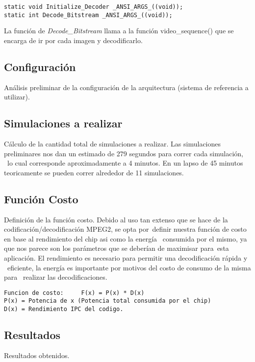 \documentclass[journal]{IEEEtran}
\begin{document}
\footnotesize \begin{verbatim}
static void Initialize_Decoder _ANSI_ARGS_((void));
static int Decode_Bitstream _ANSI_ARGS_((void));
\end{verbatim}
\normalsize

La funci\'{o}n de \textit{Decode\_Bitstream} llama a la funci\'{o}n video\_sequence() que se encarga de ir por cada imagen y decodificarlo. \newline

\subsection{Configuraci\'{o}n}
An\'{a}lisis preliminar de la configuraci\'{o}n de la arquitectura (sistema de referencia a utilizar).

\subsection{Simulaciones a realizar}
C\'{a}lculo de la cantidad total de simulaciones a realizar.
Las simulaciones preliminares nos dan un estimado de 279 segundos para correr cada simulaci\'{o}n, \
lo cual corresponde aproximadamente a 4 minutos.  En un lapso de 45 minutos teoricamente se pueden correr alrededor de 11 simulaciones.


\subsection{Funci\'{o}n Costo}
Definici\'{o}n de la funci\'{o}n costo.
Debido al uso tan extenso que se hace de la codificaci\'{o}n/decodificaci\'{o}n MPEG2, se opta por\
definir nuestra funci\'{o}n de costo en base al rendimiento del chip asi como la energ\'{i}a \
consumida por el mismo, ya que nos parece son los par\'{a}metros que se deber\'{i}an de maximisar para\
esta aplicaci\'{o}n.  El rendimiento es necesario para permitir una decodificaci\'{o}n r\'{a}pida y \
eficiente, la energ\'{i}a es importante por motivos del costo de consumo de la misma para \
realizar las decodificaciones.

\footnotesize \begin{verbatim}
Funcion de costo:     F(x) = P(x) * D(x)
P(x) = Potencia de x (Potencia total consumida por el chip)
D(x) = Rendimiento IPC del codigo.
\end{verbatim}
\normalsize

\subsection{Resultados}
Resultados obtenidos.
\end{document}
